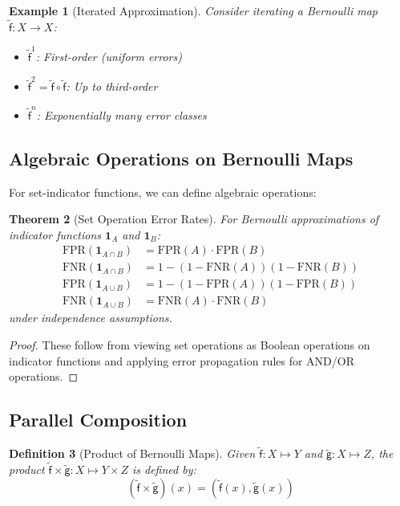 \documentclass[11pt,final,hidelinks]{article}
\newtheorem{theorem}{Theorem}[section]
\newtheorem{definition}[theorem]{Definition}
\newtheorem{example}[theorem]{Example}
\newcommand{\obs}[1]{\widetilde{#1}}  %
\newcommand{\AFun}[1]{\obs{\mathsf{#1}}}  %
\newcommand{\Set}[1]{#1}              %
\newcommand{\compose}{\circ}
\newcommand{\SetIndicator}[1]{\mathbf{1}_{#1}}
\begin{document}
\begin{example}[Iterated Approximation]
Consider iterating a Bernoulli map $\AFun{f}: \Set{X} \to \Set{X}$:
\begin{itemize}
    \item $\AFun{f}^1$: First-order (uniform errors)
    \item $\AFun{f}^2 = \AFun{f} \compose \AFun{f}$: Up to third-order
    \item $\AFun{f}^n$: Exponentially many error classes
\end{itemize}
\end{example}

\subsection{Algebraic Operations on Bernoulli Maps}

For set-indicator functions, we can define algebraic operations:

\begin{theorem}[Set Operation Error Rates]
For Bernoulli approximations of indicator functions $\SetIndicator{A}$ and $\SetIndicator{B}$:
\begin{align}
\text{FPR}(\SetIndicator{A \cap B}) &= \text{FPR}(A) \cdot \text{FPR}(B) \\
\text{FNR}(\SetIndicator{A \cap B}) &= 1 - (1-\text{FNR}(A))(1-\text{FNR}(B)) \\
\text{FPR}(\SetIndicator{A \cup B}) &= 1 - (1-\text{FPR}(A))(1-\text{FPR}(B)) \\
\text{FNR}(\SetIndicator{A \cup B}) &= \text{FNR}(A) \cdot \text{FNR}(B)
\end{align}
under independence assumptions.
\end{theorem}

\begin{proof}
These follow from viewing set operations as Boolean operations on indicator functions and applying error propagation rules for AND/OR operations.
\end{proof}

\subsection{Parallel Composition}

\begin{definition}[Product of Bernoulli Maps]
Given $\AFun{f} : \Set{X} \mapsto \Set{Y}$ and $\AFun{g} : \Set{X} \mapsto \Set{Z}$, the product $\AFun{f} \times \AFun{g} : \Set{X} \mapsto \Set{Y} \times \Set{Z}$ is defined by:
\begin{equation}
(\AFun{f} \times \AFun{g})(x) = (\AFun{f}(x), \AFun{g}(x))
\end{equation}
\end{definition}
\end{document}
